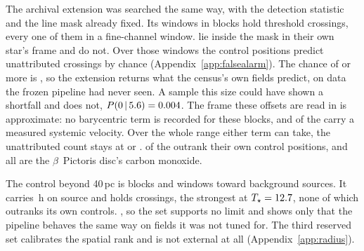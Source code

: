 The archival extension was searched the same way, with the detection
statistic and the line mask already fixed. Its \LdgExtWin{} windows in
\LdgExtEB{} blocks hold \QxObsCross{} threshold crossings, every one of them
in a fine-channel window. \QxObsAttr{} lie inside the mask in their own
star's frame and \QxObsUnattr{} do not. Over those \QxNWinA{} windows the
control positions predict \QxLam{} unattributed crossings by chance
(Appendix~\ref{app:falsealarm}). The chance of \QxObsUnattr{} or more is
\QxPGe, so the extension returns what the census's own fields predict, on data
the frozen pipeline had never seen. A sample this size could have shown a
shortfall and does not, $P(0\,|\,5.6)=0.004$. The frame these
offsets are read in is approximate: no barycentric term is recorded for
these blocks, and \QxNVsysCross{} of the \QxObsCross{} carry a measured
systemic velocity. Over the whole range either term can take, the
unattributed count stays at \QxObsUnattrLo{} or \QxObsUnattrHi.
\ExtNStageOne{} of the \QxObsCross{} outrank their own control positions,
and all \ExtNStageOne{} are the $\beta$~Pictoris disc's carbon monoxide.

The control beyond 40\,pc is \OosNBlock{} blocks and \OosNWin{} windows
toward \OosNStar{} background sources. It carries \OosHours\,h on source and
holds \OosNCross{} crossings, the strongest at $T_\star=12.7$, none of
which outranks its own controls. \OosVsysClause, so the set supports no limit and shows only that
the pipeline behaves the same way on fields it was not tuned for. The third reserved set calibrates the spatial rank
and is not external at all (Appendix~\ref{app:radius}).


